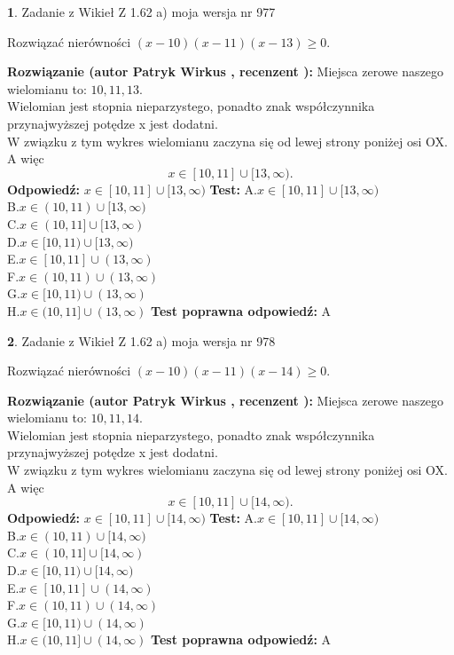 \documentclass[12pt, a4paper]{article}
\theoremstyle{definition} %
\newtheorem{zad}{}
\newcommand{\zadStart}[1]{\begin{zad}#1\newline}
\newcommand{\zadStop}{\end{zad}}
\newcommand{\rozwStart}[2]{\noindent \textbf{Rozwiązanie (autor #1 , recenzent #2): }\newline}
\newcommand{\rozwStop}{\newline}
\newcommand{\odpStart}{\noindent \textbf{Odpowiedź:}\newline}
\newcommand{\odpStop}{\newline}
\newcommand{\testStart}{\noindent \textbf{Test:}\newline}
\newcommand{\testStop}{\newline}
\newcommand{\kluczStart}{\noindent \textbf{Test poprawna odpowiedź:}\newline}
\newcommand{\kluczStop}{\newline}
\begin{document}
\zadStart{Zadanie z Wikieł Z 1.62 a) moja wersja nr 977}

Rozwiązać nierówności $(x-10)(x-11)(x-13)\ge0$.
\zadStop
\rozwStart{Patryk Wirkus}{}
Miejsca zerowe naszego wielomianu to: $10, 11, 13$.\\
Wielomian jest stopnia nieparzystego, ponadto znak współczynnika przy\linebreak najwyższej potędze x jest dodatni.\\ W związku z tym wykres wielomianu zaczyna się od lewej strony poniżej osi OX. A więc $$x \in [10,11] \cup [13,\infty).$$
\rozwStop
\odpStart
$x \in [10,11] \cup [13,\infty)$
\odpStop
\testStart
A.$x \in [10,11] \cup [13,\infty)$\\
B.$x \in (10,11) \cup [13,\infty)$\\
C.$x \in (10,11] \cup [13,\infty)$\\
D.$x \in [10,11) \cup [13,\infty)$\\
E.$x \in [10,11] \cup (13,\infty)$\\
F.$x \in (10,11) \cup (13,\infty)$\\
G.$x \in [10,11) \cup (13,\infty)$\\
H.$x \in (10,11] \cup (13,\infty)$
\testStop
\kluczStart
A
\kluczStop



\zadStart{Zadanie z Wikieł Z 1.62 a) moja wersja nr 978}

Rozwiązać nierówności $(x-10)(x-11)(x-14)\ge0$.
\zadStop
\rozwStart{Patryk Wirkus}{}
Miejsca zerowe naszego wielomianu to: $10, 11, 14$.\\
Wielomian jest stopnia nieparzystego, ponadto znak współczynnika przy\linebreak najwyższej potędze x jest dodatni.\\ W związku z tym wykres wielomianu zaczyna się od lewej strony poniżej osi OX. A więc $$x \in [10,11] \cup [14,\infty).$$
\rozwStop
\odpStart
$x \in [10,11] \cup [14,\infty)$
\odpStop
\testStart
A.$x \in [10,11] \cup [14,\infty)$\\
B.$x \in (10,11) \cup [14,\infty)$\\
C.$x \in (10,11] \cup [14,\infty)$\\
D.$x \in [10,11) \cup [14,\infty)$\\
E.$x \in [10,11] \cup (14,\infty)$\\
F.$x \in (10,11) \cup (14,\infty)$\\
G.$x \in [10,11) \cup (14,\infty)$\\
H.$x \in (10,11] \cup (14,\infty)$
\testStop
\kluczStart
A
\kluczStop
\end{document}
